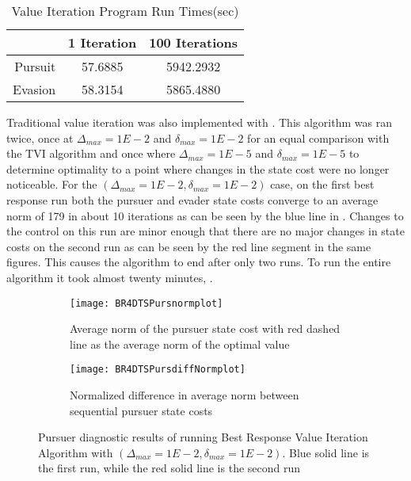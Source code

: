 \begin{table}
\caption{Value Iteration Program Run Times(sec)}
\label{4DVIrt}
\begin{center}
\begin{tabular}{||r|c|c||}\hline
  & 1 Iteration & 100 Iterations \\\hline
Pursuit & 57.6885 & 5942.2932 \\\hline
Evasion & 58.3154 & 5865.4880 \\\hline
\end{tabular}
\end{center}
\end{table}

Traditional value iteration was also implemented with . This algorithm was ran twice, once at $\Delta_{max} = 1E-2$ and $\delta_{max} = 1E-2$ for an equal comparison with the TVI algorithm  and once where $\Delta_{max} = 1E-5$ and $\delta_{max} = 1E-5$ to determine optimality to a point where changes in the state cost were no longer noticeable. For the $(\Delta_{max} = 1E-2,\delta_{max} = 1E-2)$ case, on the first best response run both the pursuer and evader state costs converge to an average norm of 179 in about 10 iterations as can be seen by the blue line in . Changes to the control on this run are minor enough that there are no major changes in state costs on the second run as can be seen by the red line segment in the same figures. This causes the algorithm to end after only two runs. To run the entire algorithm it took almost twenty minutes, . 
\begin{figure}[h!]
\centering
\begin{subfigure}[t]{0.475\textwidth}
	\centering
	\texttt{[image: BR4DTSPursnormplot]}
	\caption{Average norm of the pursuer state cost with red dashed line as the average norm of the optimal value}
	\label{BR4DTSPnp}
\end{subfigure}
\hfill
\begin{subfigure}[t]{0.475\textwidth}
	\centering
	\texttt{[image: BR4DTSPursdiffNormplot]}
	\caption{Normalized difference in average norm between sequential pursuer state costs}
	\label{BR4DTSPdnp}
\end{subfigure}
\caption{Pursuer diagnostic results of running Best Response Value Iteration Algorithm with $(\Delta_{max} = 1E-2,\delta_{max} = 1E-2)$. Blue solid line is the first run, while the red solid line is the second run}
\label{BR4DTSPdiag}
\end{figure}
